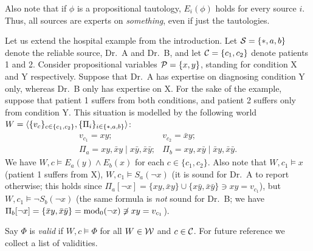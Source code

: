 Also note that if $\phi$ is a propositional tautology, $E_i(\phi)$ holds for
every source $i$. Thus, all sources are experts on \emph{something}, even if
just the tautologies.

\begin{example}
    \label{ex:hospital_world}
    Let us extend the hospital example from the introduction. Let $\S = \{\ast,
    a, b\}$ denote the reliable source, Dr.\ A and Dr.\ B, and let $\C = \{c_1,
    c_2\}$ denote patients 1 and 2. Consider propositional variables
    $\propvars = \{x, y\}$, standing
    for condition X and Y respectively. Suppose that Dr.\ A has expertise on
    diagnosing condition Y only, whereas Dr.\ B only has expertise on X. For the
    sake of the example, suppose that patient 1 suffers from both conditions,
    and patient 2 suffers only from condition Y. This situation is modelled by
    the following world $W = \tuple{\{v_c\}_{c \in \{c_1, c_2\}}, \{\Pi_i\}_{i
    \in \{\ast, a, b\}}}$:
    \[
        \begin{array}{cc}
            v_{c_1} = xy;
            &
            v_{c_2} = \bar{x}y;
            \\
            \Pi_a = xy, \bar{x}y \mid x\bar{y}, \bar{x}\bar{y};
            &
            \Pi_b = xy, x\bar{y} \mid \bar{x}y, \bar{x}\bar{y}.
        \end{array}
    \]
    We have $W, c \models E_a(y)
    \land E_b(x)$ for each $c \in \{c_1, c_2\}$. Also note that $W, c_1 \models
    x$ (patient 1 suffers from X), $W, c_1 \models S_a(\neg x)$ (it is sound
    for Dr.\ A to report otherwise; this holds since $\Pi_a[\neg x] = \{xy,
    \bar{x}y\} \cup \{x\bar{y}, \bar{x}\bar{y}\} \ni xy = v_{c_1}$), but $W,
    c_1 \models \neg S_b(\neg x)$ (the same formula is \emph{not} sound for
    Dr.\
    B; we have $\Pi_b[\neg x] = \{\bar{x}y, \bar{x}\bar{y}\} = \propmods(\neg
    x) \not\ni xy = v_{c_1}$).
\end{example}

Say $\Phi$ is \emph{valid} if $W, c \models \Phi$ for all $W \in \W$ and $c \in \C$.
For future reference we collect a list of validities.

